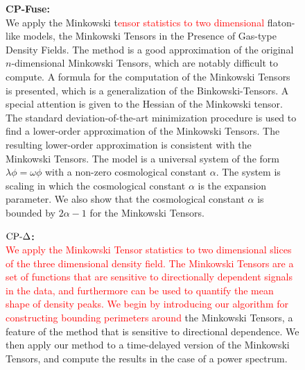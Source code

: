\begin{figure}[!htbp]
\begin{mdframed}
\begin{minipage}[t]{\textwidth}
        \textbf{CP-Fuse:} \\
We apply the Minkowski t\textcolor{red}{ensor statistics to two dimensional} flaton-like models, the Minkowski Tensors in the Presence of Gas-type Density Fields. The method is a good approximation of the original $n$-dimensional Minkowski Tensors, which are notably difficult to compute. A formula for the computation of the Minkowski Tensors is presented, which is a generalization of the Binkowski-Tensors. A special attention is given to the Hessian of the Minkowski tensor. The standard deviation-of-the-art minimization procedure is used to find a lower-order approximation of the Minkowski Tensors. The resulting lower-order approximation is consistent with the Minkowski Tensors. The model is a universal system of the form $\lambda \phi = \omega \phi$ with a non-zero cosmological constant $\alpha$. The system is scaling in which the cosmological constant $\alpha$ is the expansion parameter. We also show that the cosmological constant $\alpha$ is bounded by $2\alpha-1$ for the Minkowski Tensors.\end{minipage}
    \vspace{10pt}
    \begin{minipage}[t]{\textwidth}
        \textbf{$\text{CP-}\Delta$:} \\
\textcolor{red}{We apply the Minkowski Tensor statistics to two dimensional slices of the three dimensional density field. The Minkowski Tensors are a set of functions that are sensitive to directionally dependent signals in the data, and furthermore can be used to quantify the mean shape of density peaks. We begin by introducing our algorithm for constructing bounding perimeters around} the Minkowski Tensors, a feature of the method that is sensitive to directional dependence. We then apply our method to a time-delayed version of the Minkowski Tensors, and compute the results in the case of a power spectrum.
    \end{minipage}

\end{mdframed}
\end{figure}
